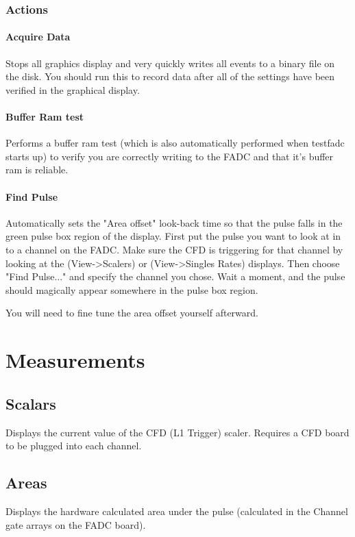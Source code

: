 \documentclass{article}
\begin{document}
\subsubsection{Actions}
\paragraph{Acquire Data}
Stops all graphics display and very quickly writes all events to a
binary file on the disk.  You should run this to record data after all
of the settings have been verified in the graphical display.

\paragraph{Buffer Ram test}
 Performs a buffer ram test (which is also automatically performed
 when testfadc starts up) to verify you are correctly writing to the
 FADC and that it's buffer ram is reliable.

\paragraph{Find Pulse}
Automatically sets the "Area offset" look-back time so that the pulse
falls in the green pulse box region of the display.  First put the
pulse you want to look at in to a channel on the FADC. Make sure the
CFD is triggering for that channel by looking at the (View->Scalers)
or (View->Singles Rates) displays. Then choose "Find Pulse..." and
specify the channel you chose.  Wait a moment, and the pulse should
magically appear somewhere in the pulse box region.

You will need to fine tune the area offset yourself afterward.

\section{Measurements}

\subsection{Scalars}
Displays the current value of the CFD (L1 Trigger) scaler.  Requires a
CFD board to be plugged into each channel.

\subsection{Areas} 
Displays the hardware calculated area under the pulse (calculated in
the Channel gate arrays on the FADC board). 
\end{document}
